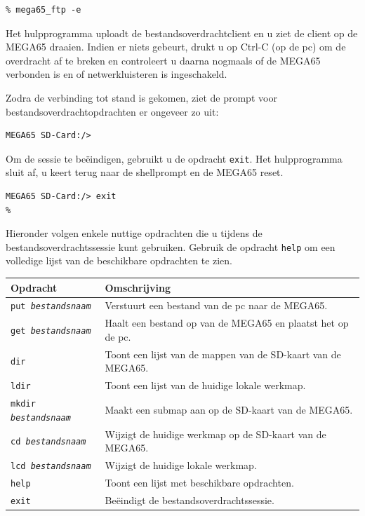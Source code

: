 \begin{verbatim}
% mega65_ftp -e
\end{verbatim}

Het hulpprogramma uploadt de bestandsoverdrachtclient en u ziet de client op de MEGA65 draaien. Indien er niets gebeurt, drukt u op Ctrl-C (op de pc) om de overdracht af te breken en controleert u daarna nogmaals of de MEGA65 verbonden is en of netwerkluisteren is ingeschakeld.

Zodra de verbinding tot stand is gekomen, ziet de prompt voor bestandsoverdrachtopdrachten er ongeveer zo uit:

\begin{verbatim}
MEGA65 SD-Card:/>
\end{verbatim}

Om de sessie te beëindigen, gebruikt u de opdracht {\tt exit}. Het hulpprogramma sluit af, u keert terug naar de shellprompt en de MEGA65 reset.

\begin{verbatim}
MEGA65 SD-Card:/> exit
%
\end{verbatim}

Hieronder volgen enkele nuttige opdrachten die u tijdens de bestandsoverdrachtssessie kunt gebruiken. Gebruik de opdracht {\tt help} om een volledige lijst van de beschikbare opdrachten te zien.

\begin{center}
\begin{tabular}{|l|l|}
\hline
{\bf Opdracht} & {\bf Omschrijving} \\
\hline
{\tt put {\it bestandsnaam}} & Verstuurt een bestand van de pc naar de MEGA65. \\
\hline
{\tt get {\it bestandsnaam}} & Haalt een bestand op van de MEGA65 en plaatst het op de pc. \\
\hline
{\tt dir} & Toont een lijst van de mappen van de SD-kaart van de MEGA65. \\
\hline
{\tt ldir} & Toont een lijst van de huidige lokale werkmap. \\
\hline
{\tt mkdir {\it bestandsnaam}} & Maakt een submap aan op de SD-kaart van de MEGA65. \\
\hline
{\tt cd {\it bestandsnaam}} & Wijzigt de huidige werkmap op de SD-kaart van de MEGA65. \\
\hline
{\tt lcd {\it bestandsnaam}} & Wijzigt de huidige lokale werkmap. \\
\hline
{\tt help} & Toont een lijst met beschikbare opdrachten. \\
\hline
{\tt exit} & Beëindigt de bestandsoverdrachtssessie. \\
\hline
\end{tabular}
\end{center}

